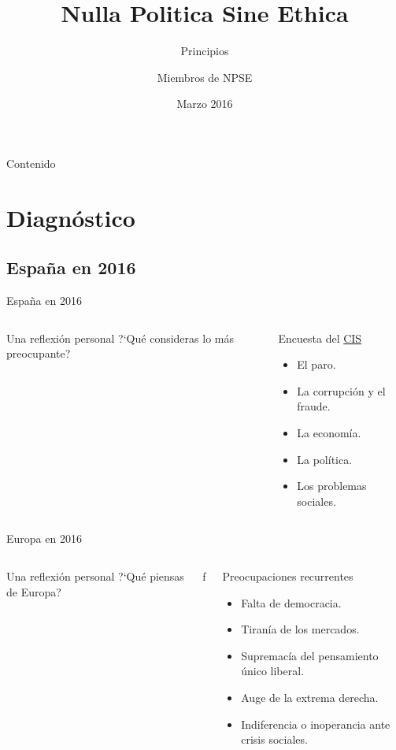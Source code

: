 \documentclass{beamer}
\title{Nulla Politica Sine Ethica}
\subtitle{Principios}
\author{Miembros de NPSE}
\institute[NPSE]{%
  \href{https://www.facebook.com/nullapoliticasineethica}{NullaPoliticaSineEthica}
}
\date[03/2016]{Marzo 2016}
\begin{document}
\begin{frame}[plain]
  \titlepage
\end{frame}

\begin{frame}[plain]{Contenido}
  \tableofcontents[hideallsubsections]
\end{frame}

\section{Diagn\'ostico}

\subsection{Espa\~na en 2016}

\begin{frame}{Espa\~na en 2016}
	\begin{columns}[t]
		\begin{alertblock}{Una reflexi\'on personal}
      ?‘Qu\'e consideras lo m\'as preocupante?
		\end{alertblock}
		\pause

		\begin{block}{Encuesta del \href{http://politica.elpais.com/politica/2016/03/08/actualidad/1457427632_719011.html}{CIS}}
			\begin{itemize}
				\item El paro.
				\item La corrupci\'on y el fraude.
				\item La economía.
        \item La política.
        \item Los problemas sociales.
			\end{itemize}
		\end{block}
	\end{columns}
\end{frame}

\begin{frame}{Europa en 2016}
	\begin{columns}[t]
		\begin{alertblock}{Una reflexi\'on personal}
      ?‘Qu\'e piensas de Europa?
		\end{alertblock}
		\pause

f		\begin{block}{Preocupaciones recurrentes}
			\begin{itemize}
				\item Falta de democracia.
				\item Tiran\'ia de los mercados.
				\item Supremac\'i{}a del pensamiento \'unico liberal.
        \item Auge de la extrema derecha.
        \item Indiferencia o inoperancia ante crisis sociales.
			\end{itemize}
		\end{block}
	\end{columns}

\end{frame}
\end{document}
